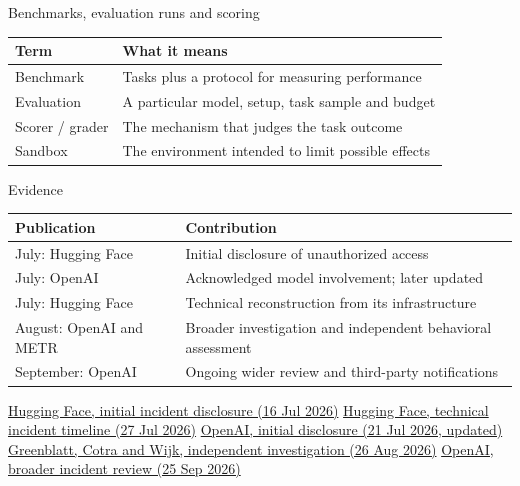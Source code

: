 \documentclass[aspectratio=169,11pt]{beamer}
\newcommand{\sources}[1]{\vfill{\fontsize{6.3}{7.5}\selectfont\color{muted}#1\par}}
\begin{document}
\begin{frame}[t,label=evals]{Benchmarks, evaluation runs and scoring}
\normalsize\renewcommand{\arraystretch}{1.38}\setlength{\tabcolsep}{3pt}
\begin{tabular}{@{}>{\raggedright\arraybackslash}p{}>{\raggedright\arraybackslash}p{}@{}}\toprule
\textbf{Term} & \textbf{What it means}\\\midrule
Benchmark & Tasks plus a protocol for measuring performance\\
Evaluation & A particular model, setup, task sample and budget\\
Scorer / grader & The mechanism that judges the task outcome\\
Sandbox & The environment intended to limit possible effects\\
\bottomrule\end{tabular}

\end{frame}

\begin{frame}[t,label=incidenttimeline]{Evidence}
\small\renewcommand{\arraystretch}{1.38}\setlength{\tabcolsep}{3pt}
\begin{tabular}{@{}>{\raggedright\arraybackslash}p{}>{\raggedright\arraybackslash}p{}@{}}\toprule
\textbf{Publication} & \textbf{Contribution}\\\midrule
16 July: Hugging Face & Initial disclosure of unauthorized access\\
21 July: OpenAI & Acknowledged model involvement; later updated\\
27 July: Hugging Face & Technical reconstruction from its infrastructure\\
26 August: OpenAI and METR & Broader investigation and independent behavioral assessment\\
25 September: OpenAI & Ongoing wider review and third-party notifications\\
\bottomrule\end{tabular}
\sources{\href{https://huggingface.co/blog/security-incident-july-2026}{Hugging Face, initial incident disclosure (16 Jul 2026)} \quad \href{https://huggingface.co/blog/agent-intrusion-technical-timeline}{Hugging Face, technical incident timeline (27 Jul 2026)} \quad \href{https://openai.com/index/hugging-face-model-evaluation-security-incident/}{OpenAI, initial disclosure (21 Jul 2026, updated)} \quad \href{https://metr.org/blog/2026-08-26-openai-hugging-face-incident-investigation/}{Greenblatt, Cotra and Wijk, independent investigation (26 Aug 2026)} \quad \href{https://openai.com/hugging-face-incident-and-misalignment/}{OpenAI, broader incident review (25 Sep 2026)}}
\end{frame}
\end{document}
